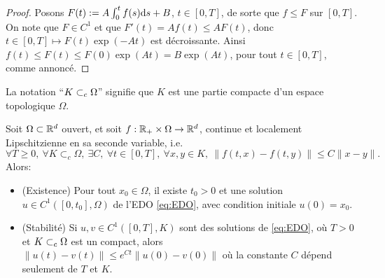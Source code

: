 \begin{proof}
	Posons $F(t) := A \int_0^t f(s) \mathrm{d} s + B$, $t \in [0,T]$, de sorte que $f \leq F$ sur $[0,T]$. On note que $F\in C^1$ et que $F'(t) = A f(t) \leq A F(t)$, donc $t\in [0,T] \mapsto F(t)\exp(-A t)$ est décroissante. Ainsi $f(t) \leq F(t) \leq F(0) \exp(At) = B \exp(At)$, pour tout $t \in [0,T]$, comme annoncé. 
\end{proof}

La notation ``$K \subset_c \Omega$'' signifie que $K$ est une partie compacte d'un espace topologique $\Omega$. 

\begin{theorem}
\label{th:Cauchy_Lipschitz}
%
Soit $\Omega\subset \mathbb{R}^d$ ouvert, et soit $f : \mathbb{R}_+ \times \Omega \to \mathbb{R}^d$, continue et localement Lipschitzienne en sa seconde variable, i.e.\
	\begin{equation}
	\label{eq:loc_lip2}
		\forall T \geq 0,\ \forall K \subset_c \Omega,\ \exists C,\ \forall t\in [0,T],\ \forall x,y \in K,\ 
		\|f(t,x) - f(t,y)\| \leq C\|x-y\|.
	\end{equation}
	Alors:
	\begin{itemize}
		\item (Existence) Pour tout $x_0 \in \Omega$, il existe $t_0>0$ et une solution $u \in C^1( [0,t_0], \Omega)$ de l'EDO \eqref{eq:EDO}, avec condition initiale $u(0) = x_0$. 
		\item (Stabilité) Si $u,v \in C^1( [0,T], K)$ sont des solutions de \eqref{eq:EDO}, où $T>0$ et $K\subset_c \Omega$ est un compact, alors $\|u(t)-v(t)\| \leq e^{C t} \|u(0)-v(0)\|$  où la constante $C$ dépend seulement de $T$ et $K$. 
	\end{itemize}
\end{theorem}

